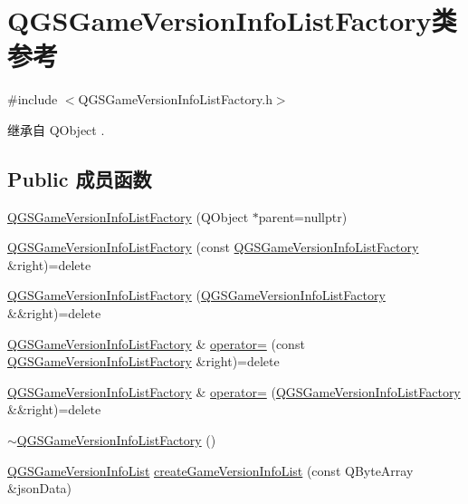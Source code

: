 \hypertarget{class_q_g_s_game_version_info_list_factory}{}\section{Q\+G\+S\+Game\+Version\+Info\+List\+Factory类 参考}
\label{class_q_g_s_game_version_info_list_factory}


{\ttfamily \#include $<$Q\+G\+S\+Game\+Version\+Info\+List\+Factory.\+h$>$}



继承自 Q\+Object .

\subsection*{Public 成员函数}
\begin{DoxyCompactItemize}
\item 
\mbox{\hyperlink{class_q_g_s_game_version_info_list_factory_ad4d9e9d4c989cd97cad244535057d233}{Q\+G\+S\+Game\+Version\+Info\+List\+Factory}} (Q\+Object $\ast$parent=nullptr)
\item 
\mbox{\hyperlink{class_q_g_s_game_version_info_list_factory_a11ffef7bfb0236c46116b19b79068ef4}{Q\+G\+S\+Game\+Version\+Info\+List\+Factory}} (const \mbox{\hyperlink{class_q_g_s_game_version_info_list_factory}{Q\+G\+S\+Game\+Version\+Info\+List\+Factory}} \&right)=delete
\item 
\mbox{\hyperlink{class_q_g_s_game_version_info_list_factory_ae13204b587075ade74280c447d03a1b9}{Q\+G\+S\+Game\+Version\+Info\+List\+Factory}} (\mbox{\hyperlink{class_q_g_s_game_version_info_list_factory}{Q\+G\+S\+Game\+Version\+Info\+List\+Factory}} \&\&right)=delete
\item 
\mbox{\hyperlink{class_q_g_s_game_version_info_list_factory}{Q\+G\+S\+Game\+Version\+Info\+List\+Factory}} \& \mbox{\hyperlink{class_q_g_s_game_version_info_list_factory_a9f833a6db416f2e38f10851f7c0f1548}{operator=}} (const \mbox{\hyperlink{class_q_g_s_game_version_info_list_factory}{Q\+G\+S\+Game\+Version\+Info\+List\+Factory}} \&right)=delete
\item 
\mbox{\hyperlink{class_q_g_s_game_version_info_list_factory}{Q\+G\+S\+Game\+Version\+Info\+List\+Factory}} \& \mbox{\hyperlink{class_q_g_s_game_version_info_list_factory_afbc59287f1b317d10d25b1804e085ed2}{operator=}} (\mbox{\hyperlink{class_q_g_s_game_version_info_list_factory}{Q\+G\+S\+Game\+Version\+Info\+List\+Factory}} \&\&right)=delete
\item 
\mbox{\hyperlink{class_q_g_s_game_version_info_list_factory_ae4af3d8fc42e1c7aa6a61afb419783f6}{$\sim$\+Q\+G\+S\+Game\+Version\+Info\+List\+Factory}} ()
\item 
\mbox{\hyperlink{class_q_g_s_game_version_info_list}{Q\+G\+S\+Game\+Version\+Info\+List}} \mbox{\hyperlink{class_q_g_s_game_version_info_list_factory_aebf756a5235b20d34771e724a03a2cfa}{create\+Game\+Version\+Info\+List}} (const Q\+Byte\+Array \&json\+Data)
\end{DoxyCompactItemize}


